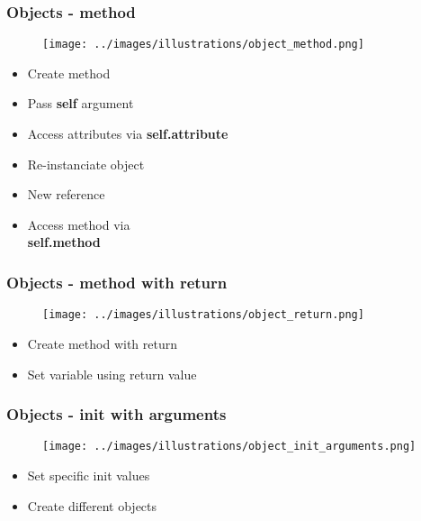 \begin{frame}\frametitle{Objects - method}
   \begin{minipage}{0.4\linewidth}
      \begin{figure}[H]
         \texttt{[image: ../images/illustrations/object\_method.png]}
      \end{figure}
   \end{minipage}
   \begin{minipage}{0.58\linewidth}
      \begin{itemize}
         \item Create method
         \item Pass \textbf{self} argument
         \item Access attributes via \textbf{self.attribute}
         \item Re-instanciate object 
         \item New reference
         \item Access method via\\\textbf{self.method}
      \end{itemize}
   \end{minipage}
\end{frame}


\begin{frame}\frametitle{Objects - method with return}
   \begin{minipage}{0.4\linewidth}
      \begin{figure}[H]
         \texttt{[image: ../images/illustrations/object\_return.png]}
      \end{figure}
   \end{minipage}
   \begin{minipage}{0.58\linewidth}
      \begin{itemize}
         \item Create method with return
         \item Set variable using return value
      \end{itemize}
   \end{minipage}
\end{frame}


\begin{frame}\frametitle{Objects - init with arguments}
   \begin{minipage}{0.48\linewidth}
      \begin{figure}[H]
         \texttt{[image: ../images/illustrations/object\_init\_arguments.png]}
      \end{figure}
   \end{minipage}
   \begin{minipage}{0.48\linewidth}
      \begin{itemize}
         \item Set specific init values
         \item Create different objects
      \end{itemize}
   \end{minipage}
\end{frame}


